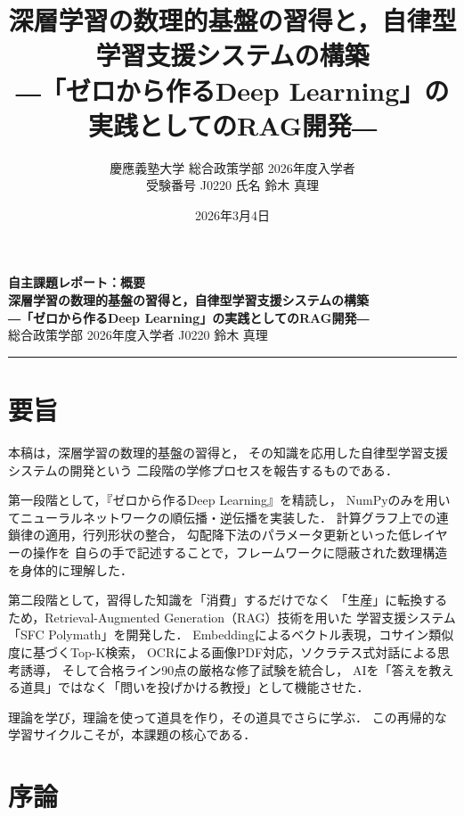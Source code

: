 \documentclass[uplatex, dvipdfmx, a4paper, 11pt]{jsarticle}
\title{深層学習の数理的基盤の習得と，自律型学習支援システムの構築\\
\large ―「ゼロから作るDeep Learning」の実践としてのRAG開発―}
\author{慶應義塾大学 総合政策学部 2026年度入学者\\
受験番号 J0220 \quad 氏名 鈴木 真理}
\date{2026年3月4日}
\begin{document}
\begin{center}
    {\Large \textbf{自主課題レポート：概要}} \\[5mm]
    {\large \textbf{深層学習の数理的基盤の習得と，自律型学習支援システムの構築}} \\[2mm]
    {\large \textbf{―「ゼロから作るDeep Learning」の実践としてのRAG開発―}} \\[5mm]
    {\large 総合政策学部 2026年度入学者 \quad J0220 \quad 鈴木 真理} \\[2mm]
    \rule{\textwidth}{0.4mm}
\end{center}

\thispagestyle{empty}

\section*{要旨}
本稿は，深層学習の数理的基盤の習得と，
その知識を応用した自律型学習支援システムの開発という
二段階の学修プロセスを報告するものである．

第一段階として，『ゼロから作るDeep Learning』を精読し，
NumPyのみを用いてニューラルネットワークの順伝播・逆伝播を実装した．
計算グラフ上での連鎖律の適用，行列形状の整合，
勾配降下法のパラメータ更新といった低レイヤーの操作を
自らの手で記述することで，フレームワークに隠蔽された数理構造を身体的に理解した．

第二段階として，習得した知識を「消費」するだけでなく
「生産」に転換するため，Retrieval-Augmented Generation（RAG）技術を用いた
学習支援システム「SFC Polymath」を開発した．
Embeddingによるベクトル表現，コサイン類似度に基づくTop-K検索，
OCRによる画像PDF対応，ソクラテス式対話による思考誘導，
そして合格ライン90点の厳格な修了試験を統合し，
AIを「答えを教える道具」ではなく「問いを投げかける教授」として機能させた．

理論を学び，理論を使って道具を作り，その道具でさらに学ぶ．
この再帰的な学習サイクルこそが，本課題の核心である．

\vfill
\clearpage

\setcounter{page}{1}

\section{序論}
\end{document}
